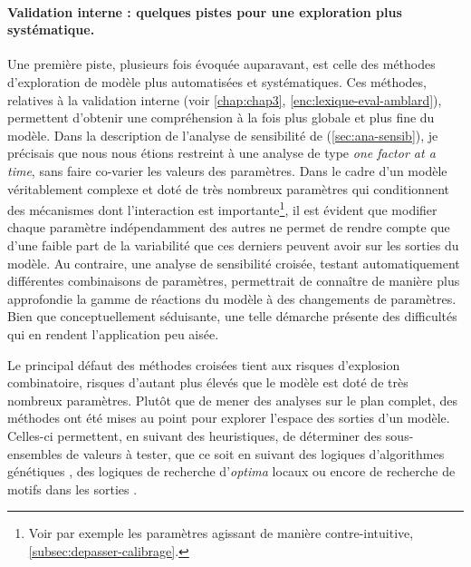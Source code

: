 \paragraph{Validation interne : quelques pistes pour une exploration plus systématique.}
Une première piste, plusieurs fois évoquée auparavant, est celle des méthodes d'exploration de modèle plus automatisées et systématiques.
Ces méthodes, relatives à la validation interne (voir \cref{chap:chap3}, \cref{enc:lexique-eval-amblard}), permettent d'obtenir une compréhension à la fois plus globale et plus fine du modèle.
Dans la description de l'analyse de sensibilité de \simfeodal{} (\cref{sec:ana-sensib}), je précisais que nous nous étions restreint à une analyse de type \og \textit{one factor at a time}\fg{}, sans faire co-varier les valeurs des paramètres.
Dans le cadre d'un modèle véritablement complexe et doté de très nombreux paramètres qui conditionnent des mécanismes dont l'interaction est importante\footnote{
	Voir par exemple les paramètres agissant de manière contre-intuitive, \cref{subsec:depasser-calibrage}.
}, il est évident que modifier chaque paramètre indépendamment des autres ne permet de rendre compte que d'une faible part de la variabilité que ces derniers peuvent avoir sur les sorties du modèle.
Au contraire, une analyse de sensibilité croisée, testant automatiquement différentes combinaisons de paramètres, permettrait de connaître de manière plus approfondie la gamme de réactions du modèle à des changements de paramètres.
Bien que conceptuellement séduisante, une telle démarche présente des difficultés qui en rendent l'application peu aisée.

Le principal défaut des méthodes croisées tient aux risques d'explosion combinatoire, risques d'autant plus élevés que le modèle est doté de très nombreux paramètres.
Plutôt que de mener des analyses sur le plan complet, des méthodes ont été mises au point pour explorer l'espace des sorties d'un modèle.
Celles-ci permettent, en suivant des heuristiques, de déterminer des sous-ensembles de valeurs à tester, que ce soit en suivant des logiques d'algorithmes génétiques \autocite{schmitt_half_2015,rey-coyrehourcq_plateforme_2015}, des logiques de recherche d'\textit{optima} locaux \autocite{schmitt_modelisation_2014, reuillon_new_2015} ou encore de recherche de motifs dans les sorties \autocite{cherel_beyond_2015}.



